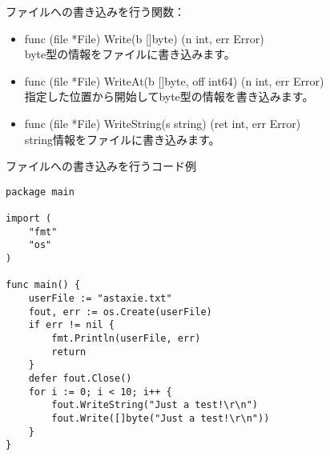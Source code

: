 ファイルへの書き込みを行う関数：

\begin{itemize}
  \item func (file *File) Write(b []byte) (n int, err Error)\\ byte型の情報をファイルに書き込みます。
  \item func (file *File) WriteAt(b []byte, off int64) (n int, err Error)\\ 指定した位置から開始してbyte型の情報を書き込みます。
  \item func (file *File) WriteString(s string) (ret int, err Error)\\ string情報をファイルに書き込みます。
\end{itemize}


ファイルへの書き込みを行うコード例


\begin{lstlisting}[numbers=none]
package main

import (
    "fmt"
    "os"
)

func main() {
    userFile := "astaxie.txt"
    fout, err := os.Create(userFile)        
    if err != nil {
        fmt.Println(userFile, err)
        return
    }
    defer fout.Close()
    for i := 0; i < 10; i++ {
        fout.WriteString("Just a test!\r\n")
        fout.Write([]byte("Just a test!\r\n"))
    }
}
\end{lstlisting}
